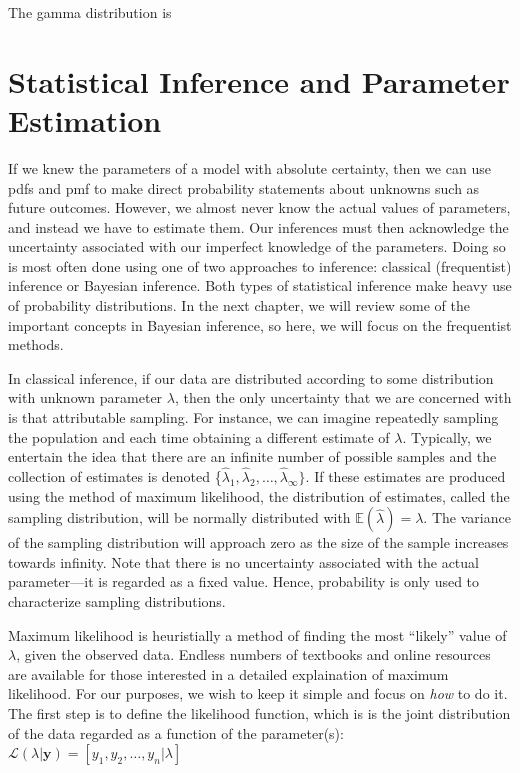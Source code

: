The gamma distribution is






\section{Statistical Inference and Parameter Estimation}

If we knew the parameters of a model with absolute certainty, then
we can use pdfs and pmf to make direct
probability statements about unknowns such as future outcomes. However, we
almost never know the actual values of parameters, and instead we have
to estimate them. Our inferences must then acknowledge the uncertainty
associated with our imperfect knowledge of the parameters. Doing so is
most often done using one of two approaches to inference:
classical (frequentist) inference or Bayesian
inference. Both types of statistical inference make heavy use of
probability distributions. In the next chapter, we will review some of
the important concepts in Bayesian inference, so here, we will
focus on the frequentist methods.

In classical inference, if our data are distributed according to some
distribution with unknown parameter $\lambda$, then the only
uncertainty that we are concerned with is that attributable
sampling. For instance, we can imagine repeatedly sampling the
population and each time obtaining a different estimate of
$\lambda$. Typically, we entertain the idea that there are an infinite
number of possible samples and the collection of estimates is denoted
\{$\hat{\lambda}_1, \hat{\lambda}_2, \hdots, \hat{\lambda}_\infty\}$. If
these estimates are produced using the method of maximum likelihood,
the distribution of estimates, called the sampling distribution, will be normally distributed with
$\mathbb{E}(\hat{\lambda})=\lambda$. The variance of the sampling
distribution
will approach zero as the size of the sample increases towards
infinity. Note that there is
no uncertainty associated with the actual parameter---it is regarded
as a fixed value. Hence, probability is only used to characterize
sampling distributions.

Maximum likelihood is heuristially a method of finding the most ``likely''
value of $\lambda$, given the observed data. Endless numbers of
textbooks and online resources are available for those interested in a
detailed explaination of maximum likelihood. For our purposes, we wish
to keep it simple and focus on \textit{how} to do it. The first step
is to define the likelihood function, which is
is the joint distribution of the data regarded as a function of
the parameter(s):
$\mathcal{L}(\lambda | \mathbf{y}) = [y_1, y_2, \dots, y_n | \lambda]$

